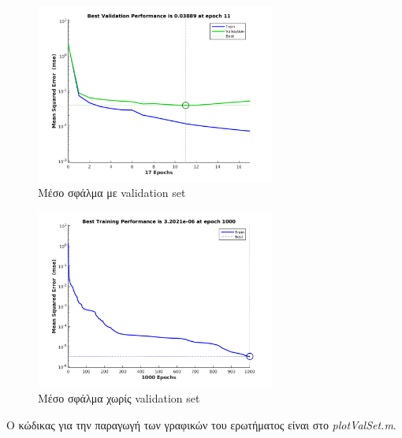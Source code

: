 \documentclass[12pt]{article}
\begin{document}
\begin{figure}[H]
	 		\centering
			\includegraphics[width=0.7\textwidth]{fakelos/6c.perf1-lvl1-30-lvl2-0.png}
			\caption{Μέσο σφάλμα με validation set}
			\label{fig:5.error-with-vs}
		\end{figure}
		
\begin{figure}[H]
	 		\centering
			\includegraphics[width=0.7\textwidth]{fakelos/6c.perf2-lvl1-30-lvl2-0.png}
			\caption{Μέσο σφάλμα χωρίς validation set}
			\label{fig:5.error-without-vs}
		\end{figure}
		
		Ο κώδικας για την παραγωγή των γραφικών του ερωτήματος είναι στο \textit{plotValSet.m}.
\end{document}
